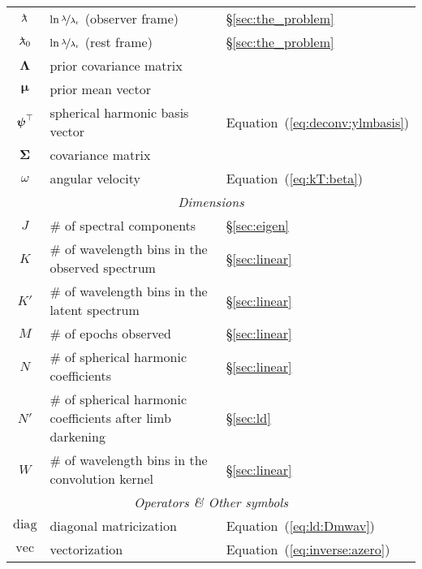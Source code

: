 \documentclass[modern]{aastex62}
\begin{document}
\begin{center}
\begin{longtable}{cll}
    $\lnlam$                 & $\ln\nicefrac{\lambda}{\lambda_\mathrm{r}}$ (observer frame)  & \S\ref{sec:the_problem}\\
    $\lnlam_0$               & $\ln\nicefrac{\lambda}{\lambda_\mathrm{r}}$ (rest frame)      & \S\ref{sec:the_problem}\\
    $\boldsymbol{\Lambda}$   & prior covariance matrix                               & \\
    $\boldsymbol{\mu}$       & prior mean vector                                     & \\
    $\boldsymbol{\psi}^\top$              & spherical harmonic basis vector                       & Equation~(\ref{eq:deconv:ylmbasis})\\
    $\boldsymbol{\Sigma}$    & covariance matrix                                     & \\
    $\omega$                 & angular velocity                                      & Equation~(\ref{eq:kT:beta})\\
    \midrule
    \multicolumn{3}{c}{\emph{Dimensions}}\\
    \midrule
    $J$                      & \# of spectral components                             & \S\ref{sec:eigen} \\
    $K$                      & \# of wavelength bins in the observed spectrum        & \S\ref{sec:linear} \\
    $K'$                     & \# of wavelength bins in the latent spectrum          & \S\ref{sec:linear}\\
    $M$                      & \# of epochs observed                                 & \S\ref{sec:linear}\\
    $N$                      & \# of spherical harmonic coefficients                 & \S\ref{sec:linear}\\
    $N'$                     & \# of spherical harmonic coefficients after limb darkening & \S\ref{sec:ld}\\
    $W$                      & \# of wavelength bins in the convolution kernel       & \S\ref{sec:linear}\\
    \midrule
    \multicolumn{3}{c}{\emph{Operators \& Other symbols}}\\
    \midrule
    $\mathrm{diag}$          & diagonal matricization                                & Equation~(\ref{eq:ld:Dmwav})\\
    $\mathrm{vec}$           & vectorization                                         & Equation~(\ref{eq:inverse:azero})\\

\end{longtable}
\end{center}
\end{document}
